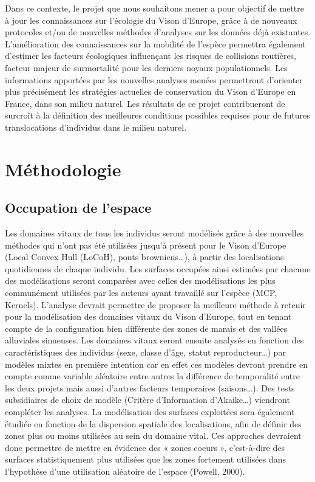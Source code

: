 \documentclass[
  letterpaper,
  DIV=11,
  numbers=noendperiod]{scrreprt}
\begin{document}
Dans ce contexte, le projet que nous souhaitons mener a pour objectif de
mettre à jour les connaissances sur l'écologie du Vison d'Europe, grâce
à de nouveaux protocoles et/ou de nouvelles méthodes d'analyses sur les
données déjà existantes. L'amélioration des connaissances sur la
mobilité de l'espèce permettra également d'estimer les facteurs
écologiques influençant les risques de collisions routières, facteur
majeur de surmortalité pour les derniers noyaux populationnels. Les
informations apportées par les nouvelles analyses menées permettront
d'orienter plus précisément les stratégies actuelles de conservation du
Vison d'Europe en France, dans son milieu naturel. Les résultats de ce
projet contribueront de surcroît à la définition des meilleures
conditions possibles requises pour de futures translocations d'individus
dans le milieu naturel.


\chapter{Méthodologie}\label{muxe9thodologie}

\section{Occupation de l'espace}\label{occupation-de-lespace}

Les domaines vitaux de tous les individus seront modélisés grâce à des
nouvelles méthodes qui n'ont pas été utilisées jusqu'à présent pour le
Vison d'Europe (Local Convex Hull (LoCoH), ponts browniens\ldots), à
partir des localisations quotidiennes de chaque individu. Les surfaces
occupées ainsi estimées par chacune des modélisations seront comparées
avec celles des modélisations les plus communément utilisées par les
auteurs ayant travaillé sur l'espèce (MCP, Kernels). L'analyse devrait
permettre de proposer la meilleure méthode à retenir pour la
modélisation des domaines vitaux du Vison d'Europe, tout en tenant
compte de la configuration bien différente des zones de marais et des
vallées alluviales sinueuses. Les domaines vitaux seront ensuite
analysés en fonction des caractéristiques des individus (sexe, classe
d'âge, statut reproducteur\ldots) par modèles mixtes en première
intention car en effet ces modèles devront prendre en compte comme
variable aléatoire entre autres la différence de temporalité entre les
deux projets mais aussi d'autres facteurs temporaires (saisons\ldots).
Des tests subsidiaires de choix de modèle (Critère d'Information
d'Akaike\ldots) viendront compléter les analyses. La modélisation des
surfaces exploitées sera également étudiée en fonction de la dispersion
spatiale des localisations, afin de définir des zones plus ou moins
utilisées au sein du domaine vital. Ces approches devraient donc
permettre de mettre en évidence des « zones coeurs », c'est-à-dire des
surfaces statistiquement plus utilisées que les zones fortement
utilisées dans l'hypothèse d'une utilisation aléatoire de l'espace
(Powell, 2000).
\end{document}
